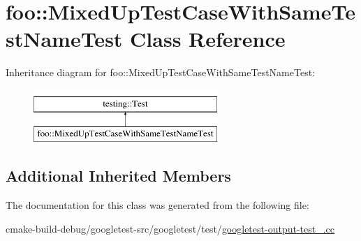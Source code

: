 \hypertarget{classfoo_1_1MixedUpTestCaseWithSameTestNameTest}{}\section{foo\+::Mixed\+Up\+Test\+Case\+With\+Same\+Test\+Name\+Test Class Reference}
\label{classfoo_1_1MixedUpTestCaseWithSameTestNameTest}
Inheritance diagram for foo\+::Mixed\+Up\+Test\+Case\+With\+Same\+Test\+Name\+Test\+:\begin{figure}[H]
\begin{center}
\leavevmode
\includegraphics[height=2.000000cm]{classfoo_1_1MixedUpTestCaseWithSameTestNameTest}
\end{center}
\end{figure}
\subsection*{Additional Inherited Members}


The documentation for this class was generated from the following file\+:\begin{DoxyCompactItemize}
\item 
cmake-\/build-\/debug/googletest-\/src/googletest/test/\mbox{\hyperlink{googletest-output-test___8cc}{googletest-\/output-\/test\+\_\+.\+cc}}\end{DoxyCompactItemize}
